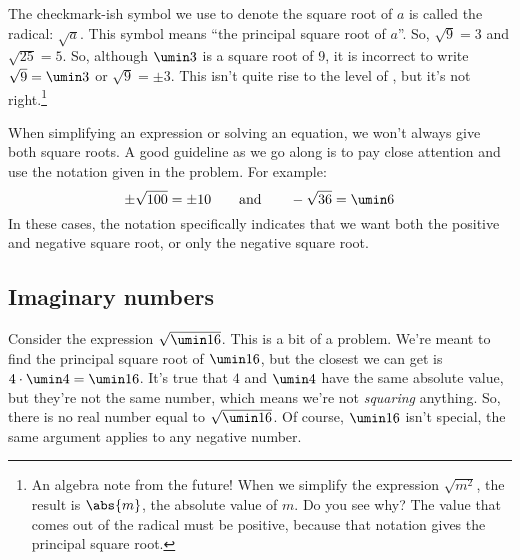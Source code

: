 The checkmark-ish symbol we use to denote the square root of $a$ is called the \gls{radical}: $\sqrt{a}$. This symbol means ``the principal square root of $a$''. So, $\sqrt{9} = 3$ and $\sqrt{25} = 5$. So, although $\umin3$ is a square root of 9, it is incorrect to write $\sqrt{9} = \umin3$ or $\sqrt{9} = \pm3$. This isn't quite rise to the level of \evilandwrong, but it's not right.\footnote{An algebra note from the future! When we simplify the expression $\sqrt{m^2}$, the result is $\abs{m}$, the absolute value of $m$. Do you see why? The value that comes out of the radical must be positive, because that notation gives the principal square root.}

When simplifying an expression or solving an equation, we won't always give both square roots.  A good guideline as we go along is to pay close attention and use the notation given in the problem. For example: \[\pm\sqrt{100} = \pm10 \qquad\text{and}\qquad -\sqrt{36} = \umin6\]
In these cases, the notation specifically indicates that we want both the positive and negative square root, or only the negative square root.

%
%

\subsection{Imaginary numbers}

Consider the expression $\sqrt{\umin16}$. This is a bit of a problem. We're meant to find the principal square root of $\umin16$, but the closest we can get is $4 \cdot \umin4 = \umin16$. It's true that $4$ and $\umin4$ have the same absolute value, but they're not the same number, which means we're not \textit{squaring} anything. So, there is no real number equal to $\sqrt{\umin16}$. Of course, $\umin16$ isn't special, the same argument applies to any negative number.

